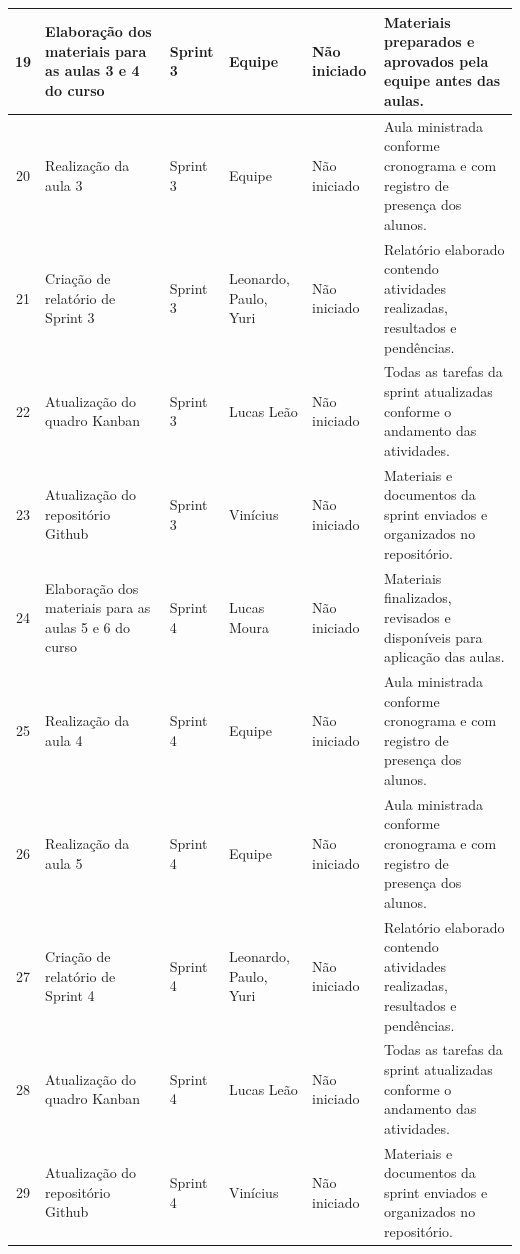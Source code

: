 \documentclass[12pt,a4paper]{article}
\begin{document}
\begin{longtable}{|c|p{3.8cm}|p{1.9cm}|p{2.2cm}|p{1.7cm}|p{4.2cm}|}
19 & Elaboração dos materiais para as aulas 3 e 4 do curso & Sprint 3 & Equipe & Não iniciado & Materiais preparados e aprovados pela equipe antes das aulas. \\ \hline

20 & Realização da aula 3 & Sprint 3 & Equipe & Não iniciado & Aula ministrada conforme cronograma e com registro de presença dos alunos. \\ \hline

21 & Criação de relatório de Sprint 3 & Sprint 3 & Leonardo, Paulo, Yuri & Não iniciado & Relatório elaborado contendo atividades realizadas, resultados e pendências. \\ \hline

22 & Atualização do quadro Kanban & Sprint 3 & Lucas Leão & Não iniciado & Todas as tarefas da sprint atualizadas conforme o andamento das atividades. \\ \hline

23 & Atualização do repositório Github & Sprint 3 & Vinícius & Não iniciado & Materiais e documentos da sprint enviados e organizados no repositório. \\ \hline

24 & Elaboração dos materiais para as aulas 5 e 6 do curso & Sprint 4 & Lucas Moura & Não iniciado & Materiais finalizados, revisados e disponíveis para aplicação das aulas. \\ \hline

25 & Realização da aula 4 & Sprint 4 & Equipe & Não iniciado & Aula ministrada conforme cronograma e com registro de presença dos alunos. \\ \hline

26 & Realização da aula 5 & Sprint 4 & Equipe & Não iniciado & Aula ministrada conforme cronograma e com registro de presença dos alunos. \\ \hline

27 & Criação de relatório de Sprint 4 & Sprint 4 & Leonardo, Paulo, Yuri & Não iniciado & Relatório elaborado contendo atividades realizadas, resultados e pendências. \\ \hline

28 & Atualização do quadro Kanban & Sprint 4 & Lucas Leão & Não iniciado & Todas as tarefas da sprint atualizadas conforme o andamento das atividades. \\ \hline

29 & Atualização do repositório Github & Sprint 4 & Vinícius & Não iniciado & Materiais e documentos da sprint enviados e organizados no repositório. \\ \hline


\end{longtable}
\end{document}
